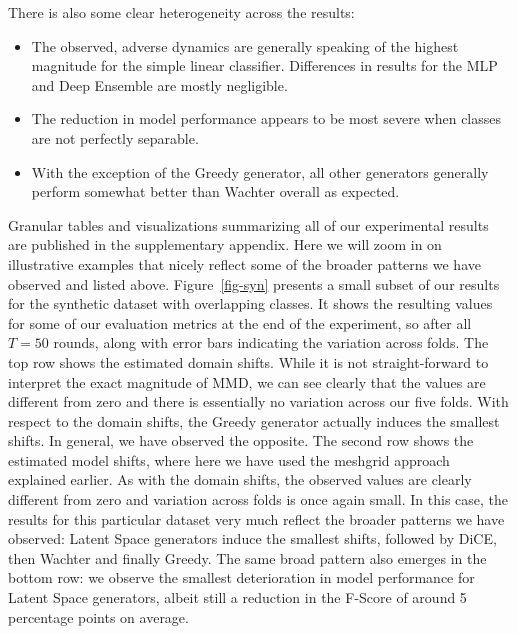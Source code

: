 \documentclass[
  conference]{IEEEtran}
\providecommand{\tightlist}{%
  \setlength{\itemsep}{0pt}\setlength{\parskip}{0pt}}\usepackage{longtable,booktabs,array}
\begin{document}
There is also some clear heterogeneity across the results:

\begin{itemize}
\tightlist
\item
  The observed, adverse dynamics are generally speaking of the highest
  magnitude for the simple linear classifier. Differences in results for
  the MLP and Deep Ensemble are mostly negligible.
\item
  The reduction in model performance appears to be most severe when
  classes are not perfectly separable.
\item
  With the exception of the Greedy generator, all other generators
  generally perform somewhat better than Wachter overall as expected.
\end{itemize}

Granular tables and visualizations summarizing all of our experimental
results are published in the supplementary appendix. Here we will zoom
in on illustrative examples that nicely reflect some of the broader
patterns we have observed and listed above. Figure~\ref{fig-syn}
presents a small subset of our results for the synthetic dataset with
overlapping classes. It shows the resulting values for some of our
evaluation metrics at the end of the experiment, so after all \(T=50\)
rounds, along with error bars indicating the variation across folds. The
top row shows the estimated domain shifts. While it is not
straight-forward to interpret the exact magnitude of MMD, we can see
clearly that the values are different from zero and there is essentially
no variation across our five folds. With respect to the domain shifts,
the Greedy generator actually induces the smallest shifts. In general,
we have observed the opposite. The second row shows the estimated model
shifts, where here we have used the meshgrid approach explained earlier.
As with the domain shifts, the observed values are clearly different
from zero and variation across folds is once again small. In this case,
the results for this particular dataset very much reflect the broader
patterns we have observed: Latent Space generators induce the smallest
shifts, followed by DiCE, then Wachter and finally Greedy. The same
broad pattern also emerges in the bottom row: we observe the smallest
deterioration in model performance for Latent Space generators, albeit
still a reduction in the F-Score of around 5 percentage points on
average.
\end{document}
